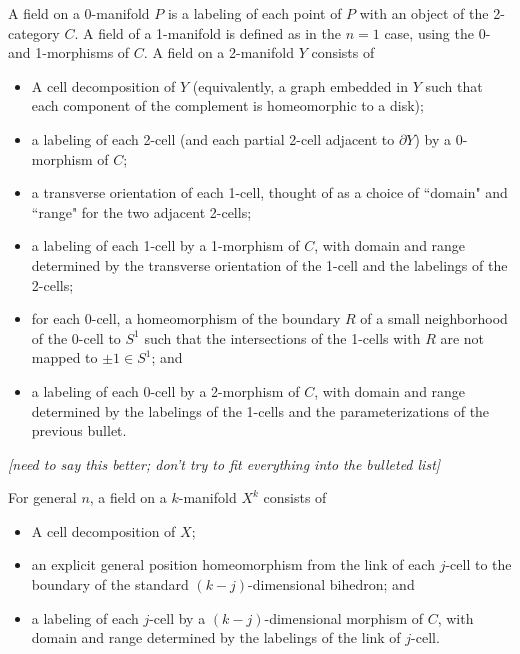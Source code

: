 \documentclass[11pt,leqno]{amsart}
\def\bd{\partial}
\def\nn#1{{{\it \small [#1]}}}
\begin{document}
A field on a 0-manifold $P$ is a labeling of each point of $P$ with
an object of the 2-category $C$.
A field of a 1-manifold is defined as in the $n=1$ case, using the 0- and 1-morphisms of $C$.
A field on a 2-manifold $Y$ consists of
\begin{itemize}
    \item A cell decomposition of $Y$ (equivalently, a graph embedded in $Y$ such
that each component of the complement is homeomorphic to a disk);
    \item a labeling of each 2-cell (and each partial 2-cell adjacent to $\bd Y$)
by a 0-morphism of $C$;
    \item a transverse orientation of each 1-cell, thought of as a choice of
``domain" and ``range" for the two adjacent 2-cells;
    \item a labeling of each 1-cell by a 1-morphism of $C$, with
domain and range determined by the transverse orientation of the 1-cell
and the labelings of the 2-cells;
    \item for each 0-cell, a homeomorphism of the boundary $R$ of a small neighborhood
of the 0-cell to $S^1$ such that the intersections of the 1-cells with $R$ are not mapped
to $\pm 1 \in S^1$; and
    \item a labeling of each 0-cell by a 2-morphism of $C$, with domain and range
determined by the labelings of the 1-cells and the parameterizations of the previous
bullet.
\end{itemize}
\nn{need to say this better; don't try to fit everything into the bulleted list}

For general $n$, a field on a $k$-manifold $X^k$ consists of
\begin{itemize}
    \item A cell decomposition of $X$;
    \item an explicit general position homeomorphism from the link of each $j$-cell
to the boundary of the standard $(k-j)$-dimensional bihedron; and
    \item a labeling of each $j$-cell by a $(k-j)$-dimensional morphism of $C$, with
domain and range determined by the labelings of the link of $j$-cell.
\end{itemize}


\medskip
\end{document}

